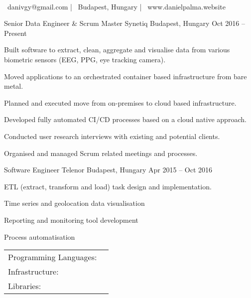 \documentclass[]{awesome-cv}
\begin{document}
    
\begin{center}
	  \\
	\vspace{2mm}
	{\faEnvelope\ danivgy@gmail.com} | {\faMapMarker\ Budapest, Hungary} | {\faLink\ www.danielpalma.website}
\end{center}
\begin{cventries}
	\cventry
	{Senior Data Engineer \& Scrum Master}
	{Synetiq}
	{Budapest, Hungary}
	{Oct 2016 – Present}
	{\begin{cvitems}
		\item {Built software to extract, clean, aggregate and visualise data from various biometric sensors (EEG, PPG, eye tracking camera).}
		\item {Moved applications to an orchestrated container based infrastructure from bare metal.}
		\item {Planned and executed move from on-premises to cloud based infrastructure.}
		\item {Developed fully automated CI/CD processes based on a cloud native approach.}
		\item {Conducted user research interviews with existing and potential clients.}
		\item {Organised and managed Scrum related meetings and processes.}
		\end{cvitems}}
	\cventry
	{Software Engineer}
	{Telenor}
	{Budapest, Hungary}
	{Apr 2015 – Oct 2016}
	{\begin{cvitems}
		\item {ETL (extract, transform and load) task design and implementation.}
		\item {Time series and geolocation data visualisation}
		\item {Reporting and monitoring tool development}
		\item {Process automatisation}
		\end{cvitems}}
\end{cventries}
\begin{cventries}
	\cventry
	{}
	{\def\arraystretch{1.15}{\begin{tabular}{ l l }
		Programming Languages:  & {\skill{ Python, JavaScript, Go, SQL, bash}} \\
		Infrastructure:  & {\skill{ Google Cloud Platform, Linux, Docker, Kubernetes, PostgreSQL}} \\
		Libraries:  & {\skill{ pandas, Luigi, SQLAlchemy, Flask, Vue.js}} \\
		\end{tabular}}}
	{}
	{}
	{}
\end{cventries}
\end{document}
